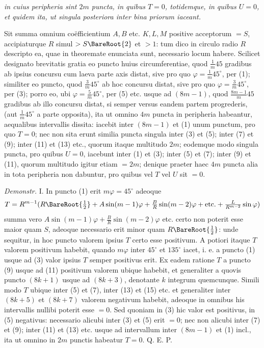 \textit{in cuius peripheria sint $2m$ puncta, in quibus $T=0$, totidemque, in quibus $U=0$, et quidem ita, ut singula posteriora inter bina priorum iaceant.}

Sit summa omnium coëfficientium $A,B$ etc. $K,L,M$ positive acceptorum $=S$, accipiaturque $R$ simul $>S\BareRoot{2}$ et $>1$: tum dico in circulo radio $R$ descripto ea, quae in theoremate enunciata sunt, necessario locum habere. Scilicet designato brevitatis gratia eo puncto huius circumferentiae, quod $\frac1m45$ gradibus ab ipsius concursu cum laeva parte axis distat, sive pro quo $\varphi=\frac1m45^\circ$, per (1); similiter eo puncto, quod $\frac3m45^\circ$ ab hoc concursu distat, sive pro quo $\varphi=\frac3m45^\circ$, per (3); porro eo, ubi $\varphi=\frac5m45^\circ$, per (5) etc. usque ad $(8m-1)$, quod $\frac{8m-1}m45$ gradibus ab illo concursu distat, si semper versus eandem partem progrederis, (aut $\frac1m45^\circ$ a parte opposita), ita ut omnino $4m$ puncta in peripheria habeantur, aequalibus intervallis dissita: iacebit inter $(8m-1)$ et (1) unum punctum, pro quo $T=0$; nec non sita erunt similia puncta singula inter (3) et (5); inter (7) et (9); inter (11) et (13) etc., quorum itaque multitudo $2m$; eodemque modo singula puncta, pro quibus $U=0$, iacebunt inter (1) et (3); inter (5) et (7); inter (9) et (11), quorum multitudo igitur etiam $=2m$; denique praeter haec $4m$ puncta alia in tota peripheria non dabuntur, pro quibus vel $T$ vel $U$ sit $=0$.

\textit{Demonstr.} I. In puncto (1) erit $m\varphi=45^\circ$ adeoque
\[ T=R^{m-1}(R\BareRoot{\tfrac12}+A\sin(m-1)\varphi+\tfrac BR\sin(m-2)\varphi+\text{etc.}+\tfrac L{R^{m-2}}\sin\varphi)
\] summa vero $A\sin(m-1)\varphi+\frac BR\sin(m-2)\varphi$ etc. certo non poterit esse maior quam $S$, adeoque necessario erit minor quam $R\BareRoot{\frac12}$: unde sequitur, in hoc puncto valorem ipsius $T$ certo esse positivum. A potiori itaque $T$ valorem positivum habebit, quando $m\varphi$ inter $45^\circ$ et $135^\circ$ iacet, i. e. a puncto (1) usque ad (3) valor ipsius $T$ semper positivus erit. Ex eadem ratione $T$ a puncto (9) usque ad (11) positivum valorem ubique habebit, et generaliter a quovis puncto $(8k+1)$ usque ad $(8k+3)$, denotante $k$ integrum quemcunque. Simili modo $T$ ubique inter (5) et (7), inter (13) et (15) etc. et generaliter inter $(8k+5)$ et $(8k+7)$ valorem negativum habebit, adeoque in omnibus his intervallis nullibi poterit esse $=0$. Sed quoniam in (3) hic valor est positivus, in (5) negativus: necessario alicubi inter (3) et (5) erit $=0$; nec non alicubi inter (7) et (9); inter (11) et (13) etc.
usque ad intervallum inter $(8m-1)$ et (1) incl., ita ut omnino in $2m$ punctis habeatur $T=0$. Q. E. P.

